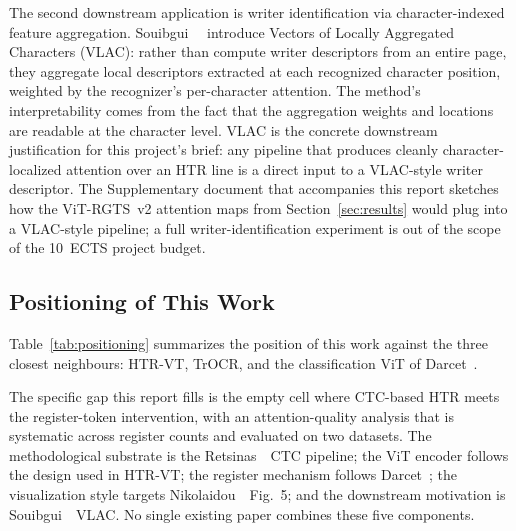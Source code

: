 The second downstream application is writer identification via character-indexed feature aggregation. Souibgui~\etal~\cite{souibgui2022vlac} introduce Vectors of Locally Aggregated Characters (VLAC): rather than compute writer descriptors from an entire page, they aggregate local descriptors extracted at each recognized character position, weighted by the recognizer's per-character attention. The method's interpretability comes from the fact that the aggregation weights and locations are readable at the character level. VLAC is the concrete downstream justification for this project's brief: any pipeline that produces cleanly character-localized attention over an HTR line is a direct input to a VLAC-style writer descriptor. The Supplementary document that accompanies this report sketches how the ViT-RGTS~v2 attention maps from Section~\ref{sec:results} would plug into a VLAC-style pipeline; a full writer-identification experiment is out of the scope of the 10~ECTS project budget.

\subsection{Positioning of This Work}
\label{sec:rw_positioning}

Table~\ref{tab:positioning} summarizes the position of this work against the three closest neighbours: HTR-VT, TrOCR, and the classification ViT of Darcet~\etal.

\begin{table}[t]
\centering
\small
\caption{Positioning against the closest published work.}
\label{tab:positioning}
\end{table}

The specific gap this report fills is the empty cell where CTC-based HTR meets the register-token intervention, with an attention-quality analysis that is systematic across register counts and evaluated on two datasets. The methodological substrate is the Retsinas~\etal\ CTC pipeline; the ViT encoder follows the design used in HTR-VT; the register mechanism follows Darcet~\etal; the visualization style targets Nikolaidou~\etal\ Fig.~5; and the downstream motivation is Souibgui~\etal~VLAC. No single existing paper combines these five components.
